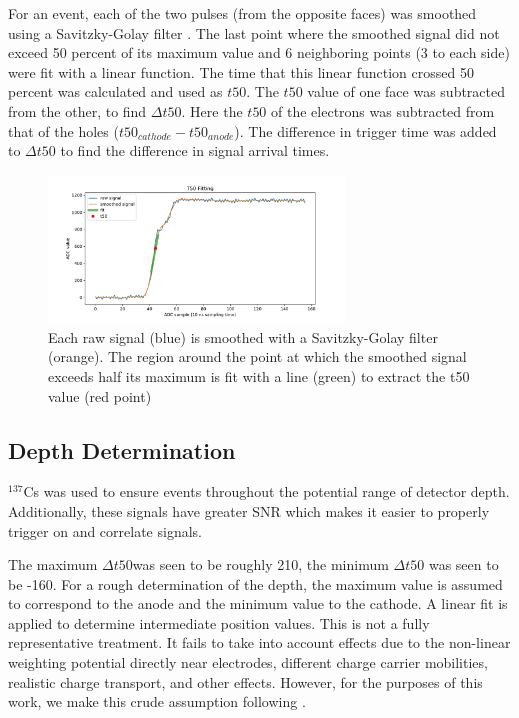 For an event, each of the two pulses (from the opposite faces) was smoothed using a Savitzky-Golay filter \cite{scipy}. The last point where the smoothed signal did not exceed 50 percent of its maximum value and 6 neighboring points (3 to each side) were fit with a linear function. The time that this linear function crossed 50 percent was calculated and used as $t50$. The $t50$ value of one face was subtracted from the other, to find $\Delta t50$. Here the $t50$ of the electrons was subtracted from that of the holes ($t50_{cathode}- t50_{anode}$). The difference in trigger time was added to $\Delta t50$ to find the difference in signal arrival times.

\begin{figure}
\begin{centering}
\includegraphics[width=0.7\textwidth]{./figures/t50_fitting.pdf}
\caption{Each raw signal (blue) is smoothed with a Savitzky-Golay filter (orange). The region around the point at which the smoothed signal exceeds half its maximum is fit with a line (green) to extract the t50 value (red point)}
\label{fit}
\end{centering}
\end{figure}

\subsection*{Depth Determination}

${}^{137}$Cs was used to ensure events throughout the potential range of detector depth. Additionally, these signals have greater SNR which makes it easier to properly trigger on and correlate signals.

The maximum $\Delta t50$was seen to be roughly 210, the minimum $\Delta t50$ was seen to be -160. For a rough determination of the depth, the maximum value is assumed to correspond to the anode and the minimum value to the cathode. A linear fit is applied to determine intermediate position values. This is not a fully representative treatment. It fails to take into account effects due to the non-linear weighting potential directly near electrodes, different charge carrier mobilities, realistic charge transport, and other effects. However, for the purposes of this work, we make this crude assumption following \cite{amman}.

